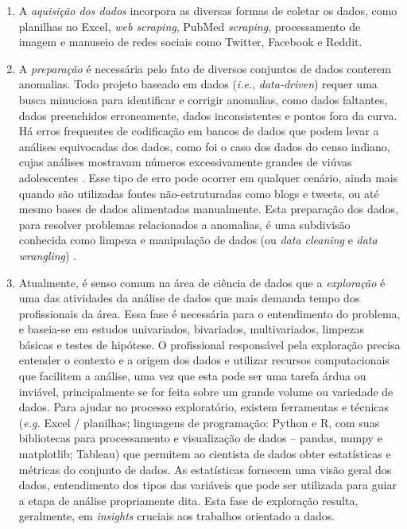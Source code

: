 \begin{enumerate}
        \item A \textit{aquisição dos dados} incorpora as diversas formas de coletar os dados, como planilhas no Excel, \textit{web scraping}, PubMed \textit{scraping}, processamento de imagem e manuseio de redes sociais como Twitter, Facebook e Reddit.
      
        \item A \textit{preparação} é necessária pelo fato de diversos conjuntos de dados conterem anomalias. 
        Todo projeto baseado em dados (\textit{i.e.}, \textit{data-driven}) requer uma busca minuciosa para identificar e corrigir anomalias, como dados faltantes, dados preenchidos erroneamente, dados inconsistentes e pontos fora da curva.
        Há erros frequentes de codificação em bancos de dados que podem levar a análises equivocadas dos dados, como foi o caso dos dados do censo indiano, cujas análises mostravam números excessivamente grandes de viúvas adolescentes  \cite{coale1962case}. 
        Esse tipo de erro pode ocorrer em qualquer cenário, ainda mais quando são utilizadas fontes não-estruturadas como blogs e tweets, ou até mesmo bases de dados alimentadas manualmente. 
        Esta preparação dos dados, para resolver problemas relacionados a anomalias, é uma subdivisão conhecida como limpeza e manipulação de dados (ou \textit{data cleaning} e \textit{data wrangling}) \cite{donoho201750}.
         
        \item Atualmente, é senso comum na área de ciência de dados que a \textit{exploração} é uma das atividades da análise de dados \cite{tukey1977exploratory} que mais demanda tempo dos profissionais da área. Essa fase é necessária para o entendimento do problema, e baseia-se em estudos univariados, bivariados, multivariados, limpezas básicas e testes de hipótese.
        O profissional responsável pela exploração precisa entender o contexto e a origem dos dados e utilizar recursos computacionais que facilitem a análise, uma vez que esta pode ser uma tarefa árdua ou inviável, principalmente se for feita sobre um grande volume ou variedade de dados. 
        Para ajudar no processo exploratório, existem ferramentas e técnicas (\textit{e.g.} Excel / planilhas; linguagens de programação: Python e R, com suas bibliotecas para processamento e visualização de dados -- pandas, numpy e matplotlib; Tableau) que permitem ao cientista de dados obter estatísticas e métricas do conjunto de dados. 
        As estatísticas fornecem uma visão geral dos dados, entendimento dos tipos das variáveis que pode ser utilizada para guiar a etapa de análise propriamente dita.
        Esta fase de exploração resulta, geralmente, em \textit{insights} cruciais aos trabalhos orientado a dados.
        \end{enumerate}

